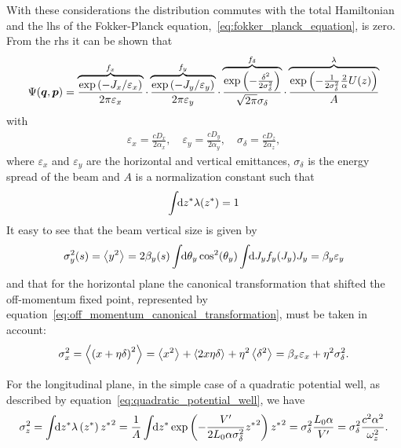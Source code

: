     With these considerations the distribution commutes with the total Hamiltonian and the \gls{lhs} of the Fokker-Planck equation,~\eqref{eq:fokker_planck_equation}, is zero. From the \gls{rhs} it can be shown that
    \begin{align}\label{eq:equilibrium_distribution}
        \Psi(\boldsymbol{q},\boldsymbol{p}) =
        \overbrace{
        \frac{\exp\left(-J_x/\varepsilon_x\right)}{2\pi\varepsilon_x}}^{f_x}\cdot
        \overbrace{
        \frac{\exp\left(-J_y/\varepsilon_y\right)}{2\pi\varepsilon_y}}^{f_y}\cdot
        \overbrace{
        \frac{\exp\left(-\frac{\delta^2}{2\sigma_\delta^2}\right)}{\sqrt{2\pi}\sigma_\delta}}^{f_\delta}\cdot
        \overbrace{
        \frac{\exp\left(-\frac{1}{2\sigma_\delta^2}\frac2\alpha U(z)\right)}{A}}^{\lambda}
    \end{align}
    with
    \begin{align}
        \varepsilon_x = \frac{cD_x}{2\alpha_x}, \quad
        \varepsilon_y = \frac{cD_y}{2\alpha_y}, \quad
        \sigma_\delta = \frac{cD_z}{2\alpha_z},
    \end{align}
    where $\varepsilon_x$ and $\varepsilon_y$ are the horizontal and vertical emittances, $\sigma_\delta$ is the energy spread of the beam and $A$ is a normalization constant such that
    \begin{align}
        \int\!\!\text{d}z^* \lambda(z^*)=1
    \end{align}
    It easy to see that the beam vertical size is given by
    \begin{align}
        \sigma_y^2(s) = \left\langle y^2 \right\rangle_{{}} = 2\beta_y(s)\int\!\!\text{d}\theta_y \cos^2(\theta_y)\int\!\!\text{d}J_y f_y(J_y)J_y = \beta_y\varepsilon_y
    \end{align}
    and that for the horizontal plane the canonical transformation that shifted the off-momentum fixed point, represented by equation~\eqref{eq:off_momentum_canonical_transformation}, must be taken in account:
    \begin{align}
        \sigma_x^2 = \left\langle \left(x+\eta\delta\right)^2 \right\rangle_{{}} = \left\langle x^2 \right\rangle_{{}} + \left\langle 2x\eta\delta \right\rangle_{{}} + \eta^2\left\langle \delta^2 \right\rangle_{{}} = \beta_x\varepsilon_x + \eta^2\sigma_\delta^2.
    \end{align}

    For the longitudinal plane, in the simple case of a quadratic potential well, as described by equation~\eqref{eq:quadratic_potential_well}, we have
    \begin{align}
        \sigma_z^2 = \int\!\!\text{d}z^* \lambda\left(z^*\right){z^*}^2 =
        \frac1A\int\!\!\text{d}z^* 
            \exp\left(-\frac{V'}{2L_0\alpha\sigma_\delta^2} {z^*}^2\right){z^*}^2
        = \sigma_\delta^2\frac{L_0\alpha}{V'} = \sigma_\delta^2 \frac{c^2\alpha^2}{\omega_z^2}.
    \end{align}


